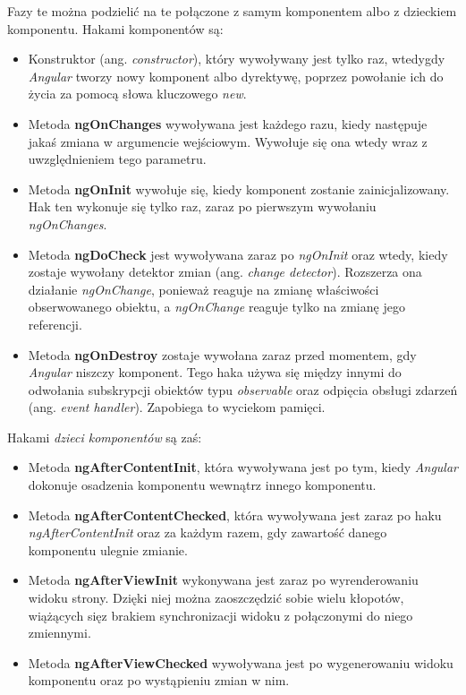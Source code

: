 \documentclass[twoside]{projektInzynierskiMS}
\numberwithin{figure}{section}
\begin{document}
Fazy te można podzielić na te połączone z samym komponentem albo z dzieckiem komponentu. 
Hakami komponentów są:
\begin{itemize}
    \item Konstruktor (ang. \textit{constructor}), który wywoływany jest tylko raz, wtedy\linebreak gdy \textit{Angular} tworzy nowy komponent albo dyrektywę, poprzez powołanie ich do życia za pomocą słowa kluczowego \textit{new}.
    \item Metoda \textbf{ngOnChanges} wywoływana jest każdego razu, kiedy następuje jakaś zmiana w argumencie wejściowym. Wywołuje się ona wtedy wraz z uwzględnieniem tego parametru.
    \item Metoda \textbf{ngOnInit} wywołuje się, kiedy komponent zostanie zainicjalizowany. Hak ten wykonuje się tylko raz, zaraz po pierwszym wywołaniu \textit{ngOnChanges}.
    \item Metoda \textbf{ngDoCheck} jest wywoływana zaraz po \textit{ngOnInit} oraz wtedy, kiedy zostaje wywołany detektor zmian (ang. \textit{change detector}). Rozszerza ona działanie \textit{ngOnChange}, ponieważ reaguje na zmianę właściwości obserwowanego obiektu, a \textit{ngOnChange} reaguje tylko na zmianę jego referencji.
    \item Metoda \textbf{ngOnDestroy} zostaje wywołana zaraz przed momentem, gdy \textit{Angular} niszczy komponent. Tego haka używa się między innymi do odwołania subskrypcji obiektów typu \textit{observable} oraz odpięcia obsługi zdarzeń (ang. \textit{event handler}). Zapobiega to wyciekom pamięci.
\end{itemize}

Hakami \textit{dzieci komponentów} są zaś:
\begin{itemize}
    \item Metoda \textbf{ngAfterContentInit}, która wywoływana jest po tym, kiedy \textit{Angular} dokonuje osadzenia komponentu wewnątrz innego komponentu.
    \item Metoda \textbf{ngAfterContentChecked}, która wywoływana jest zaraz po haku \textit{ngAfterContentInit} oraz za każdym razem, gdy zawartość danego komponentu ulegnie zmianie.
    \item Metoda \textbf{ngAfterViewInit} wykonywana jest zaraz po wyrenderowaniu widoku strony. Dzięki niej można zaoszczędzić sobie wielu kłopotów, wiążących się\linebreak z brakiem synchronizacji widoku z połączonymi do niego zmiennymi.
    \item Metoda \textbf{ngAfterViewChecked} wywoływana jest po wygenerowaniu widoku komponentu oraz po wystąpieniu zmian w nim.
\end{itemize}
\end{document}
